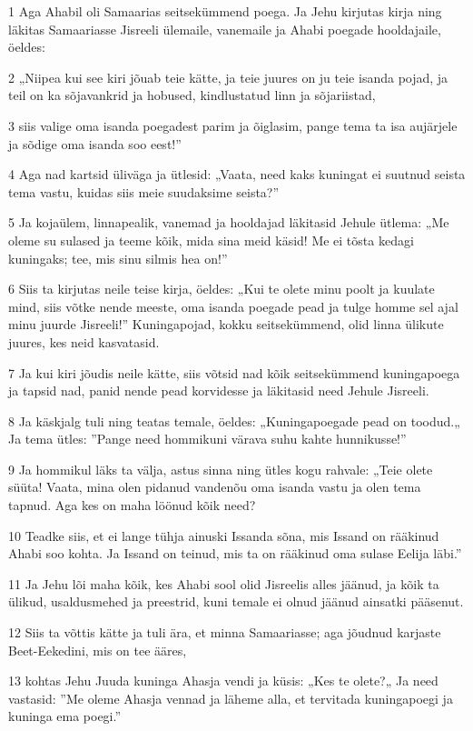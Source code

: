 \par 1 Aga Ahabil oli Samaarias seitsekümmend poega. Ja Jehu kirjutas kirja ning läkitas Samaariasse Jisreeli ülemaile, vanemaile ja Ahabi poegade hooldajaile, öeldes:
\par 2 „Niipea kui see kiri jõuab teie kätte, ja teie juures on ju teie isanda pojad, ja teil on ka sõjavankrid ja hobused, kindlustatud linn ja sõjariistad,
\par 3 siis valige oma isanda poegadest parim ja õiglasim, pange tema ta isa aujärjele ja sõdige oma isanda soo eest!”
\par 4 Aga nad kartsid üliväga ja ütlesid: „Vaata, need kaks kuningat ei suutnud seista tema vastu, kuidas siis meie suudaksime seista?”
\par 5 Ja kojaülem, linnapealik, vanemad ja hooldajad läkitasid Jehule ütlema: „Me oleme su sulased ja teeme kõik, mida sina meid käsid! Me ei tõsta kedagi kuningaks; tee, mis sinu silmis hea on!”
\par 6 Siis ta kirjutas neile teise kirja, öeldes: „Kui te olete minu poolt ja kuulate mind, siis võtke nende meeste, oma isanda poegade pead ja tulge homme sel ajal minu juurde Jisreeli!” Kuningapojad, kokku seitsekümmend, olid linna ülikute juures, kes neid kasvatasid.
\par 7 Ja kui kiri jõudis neile kätte, siis võtsid nad kõik seitsekümmend kuningapoega ja tapsid nad, panid nende pead korvidesse ja läkitasid need Jehule Jisreeli.
\par 8 Ja käskjalg tuli ning teatas temale, öeldes: „Kuningapoegade pead on toodud.„ Ja tema ütles: ”Pange need hommikuni värava suhu kahte hunnikusse!”
\par 9 Ja hommikul läks ta välja, astus sinna ning ütles kogu rahvale: „Teie olete süüta! Vaata, mina olen pidanud vandenõu oma isanda vastu ja olen tema tapnud. Aga kes on maha löönud kõik need?
\par 10 Teadke siis, et ei lange tühja ainuski Issanda sõna, mis Issand on rääkinud Ahabi soo kohta. Ja Issand on teinud, mis ta on rääkinud oma sulase Eelija läbi.”
\par 11 Ja Jehu lõi maha kõik, kes Ahabi sool olid Jisreelis alles jäänud, ja kõik ta ülikud, usaldusmehed ja preestrid, kuni temale ei olnud jäänud ainsatki pääsenut.
\par 12 Siis ta võttis kätte ja tuli ära, et minna Samaariasse; aga jõudnud karjaste Beet-Eekedini, mis on tee ääres,
\par 13 kohtas Jehu Juuda kuninga Ahasja vendi ja küsis: „Kes te olete?„ Ja need vastasid: ”Me oleme Ahasja vennad ja läheme alla, et tervitada kuningapoegi ja kuninga ema poegi.”
